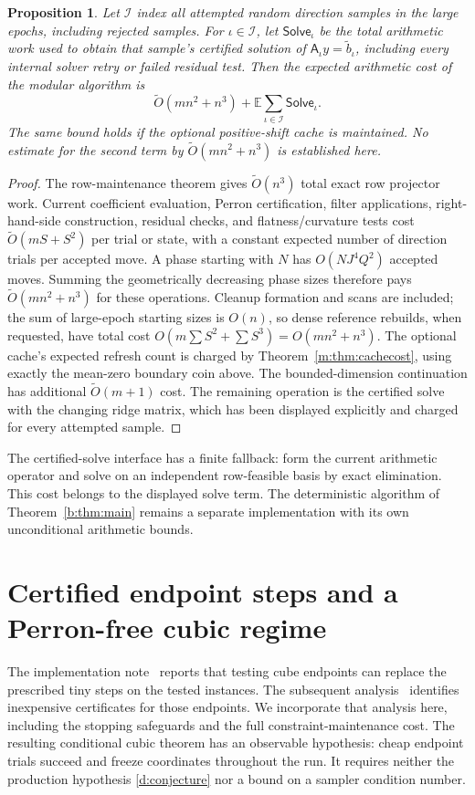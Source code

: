 \documentclass[11pt]{amsart}
\newtheorem{proposition}[theorem]{Proposition}
\theoremstyle{definition}\newtheorem{definition}[theorem]{Definition}
\theoremstyle{remark}\newtheorem{remark}[theorem]{Remark}
\numberwithin{equation}{section}
\begin{document}
\begin{proposition}\label{a:accounting}
Let $\mathcal I$ index all attempted random direction samples in the large
epochs, including rejected samples. For $\iota\in\mathcal I$, let
$\mathsf{Solve}_\iota$ be the total arithmetic work used to obtain that
sample's certified solution of $\mathsf A_\iota y=\widetilde b_\iota$,
including every internal solver retry or failed residual test. Then the
expected arithmetic cost of the modular algorithm is
\[
 \widetilde O(mn^2+n^3)
       +\mathbb E\sum_{\iota\in\mathcal I}\mathsf{Solve}_\iota.
\]
The same bound holds if the optional positive-shift cache is maintained.
No estimate for the second term by $\widetilde O(mn^2+n^3)$ is established
here.
\end{proposition}
\begin{proof}
The row-maintenance theorem gives $\widetilde O(n^3)$ total exact row
projector work. Current coefficient evaluation, Perron certification,
filter applications, right-hand-side construction, residual checks, and
flatness/curvature tests cost $\widetilde O(mS+S^2)$ per trial or state,
with a constant expected number of direction trials per accepted move. A phase
starting with $N$ has $O(NJ^4Q^2)$ accepted moves. Summing the geometrically
decreasing phase sizes therefore pays
$\widetilde O(mn^2+n^3)$ for these operations. Cleanup formation and scans
are included; the sum of large-epoch starting sizes is $O(n)$, so dense
reference rebuilds, when requested, have total cost
$O(m\sum S^2+\sum S^3)=O(mn^2+n^3)$.
The optional cache's expected refresh count is charged by
Theorem~\ref{m:thm:cachecost}, using exactly the mean-zero boundary coin
above. The bounded-dimension continuation has additional
$\widetilde O(m+1)$ cost. The remaining operation is the certified solve
with the changing ridge matrix, which has been displayed explicitly and
charged for every attempted sample.
\end{proof}

The certified-solve interface has a finite fallback: form the current
arithmetic operator and solve on an independent row-feasible basis by
exact elimination. This cost belongs to the displayed solve term.
The deterministic algorithm of Theorem~\ref{b:thm:main} remains a
separate implementation with its own unconditional arithmetic bounds.


\section{Certified endpoint steps and a Perron-free cubic regime}
\label{ep:section}
The implementation note~\cite{CertSteps} reports that testing cube
endpoints can replace the prescribed tiny steps on the tested instances.
The subsequent analysis~\cite{CertAnalysis} identifies inexpensive
certificates for those endpoints. We incorporate that analysis here,
including the stopping safeguards and the full constraint-maintenance
cost. The resulting conditional cubic theorem has an observable
hypothesis: cheap endpoint trials succeed and freeze coordinates
throughout the run. It requires neither the production hypothesis
\eqref{d:conjecture} nor a bound on a sampler condition number.
\end{document}
